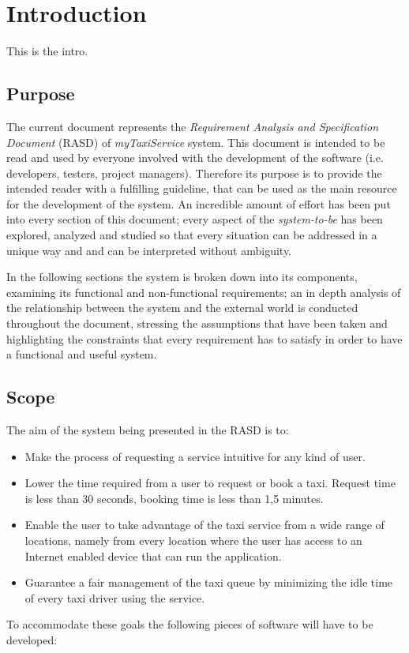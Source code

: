 \documentclass[12pt, a4paper]{article}
\begin{document}
\section{Introduction}

This is the intro.

\subsection{Purpose}

The current document represents the \emph{Requirement Analysis and Specification Document} (RASD) of \emph{myTaxiService} system.
This document is intended to be read and used by everyone involved with the development of the software (i.e. developers, testers, project managers). Therefore its purpose is to provide the intended reader with a fulfilling guideline, that can be used as the main resource for the development of the system.
An incredible amount of effort has been put into every section of this document; every aspect of the \emph{system-to-be} has been explored, analyzed and studied so that every situation can be addressed in a unique way and and can be interpreted without ambiguity.

In the following sections the system is broken down into its components, examining its functional and non-functional requirements; an in depth analysis of the relationship between the system and the external world is conducted throughout the document, stressing the assumptions that have been taken and highlighting the constraints that every requirement has to satisfy in order to have a functional and useful system.

\subsection{Scope}

The aim of the system being presented in the RASD is to:
\begin{itemize}
\item Make the process of requesting a service intuitive for any kind of user.
\item Lower the time required from a user to request or book a taxi. Request time is less than 30 seconds, booking time is less than 1,5 minutes.
\item Enable the user to take advantage of the taxi service from a wide range of locations, namely from every location where the user has access to an Internet enabled device that can run the application.
\item Guarantee a fair management of the taxi queue by minimizing the idle time of every taxi driver using the service.
\end{itemize}
To accommodate these goals the following pieces of software will have to be developed:
\end{document}

